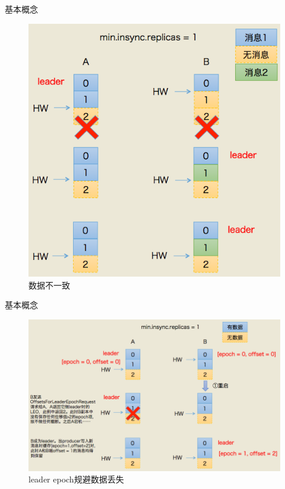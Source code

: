 \begin{frame}[plain,t]{基本概念} %
 \\  
	\vspace{1ex}

	\begin{figure}
		\centering
		\includegraphics[width=0.6\linewidth]{image/0107}
		\caption{数据不一致}
		\label{fig:0107}
	\end{figure}
	
	
	
\end{frame}
\begin{frame}[plain,t]{基本概念} %
 \\  \vspace{2ex}
	\begin{figure}
		\centering
		\includegraphics[width=0.9\linewidth]{image/0108}
		\caption{leader epoch规避数据丢失}
		\label{fig:0108}
	\end{figure}
	
\end{frame}
